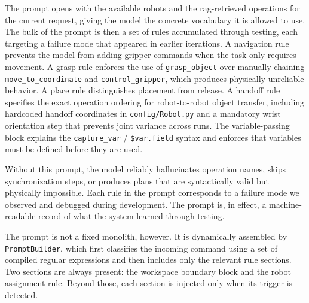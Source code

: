 \documentclass[
     12pt,
     a4paper,
     BCOR=10mm,
     DIV=14,
     listof=totoc,
     bibliography=totoc,
     parskip,
     twoside,
     headsepline
     ]{scrreprt}
\begin{document}
The prompt opens with the available robots and the \gls{rag}-retrieved operations for the current request, giving the model the concrete vocabulary it is allowed to use. The bulk of the prompt is then a set of rules accumulated through testing, each targeting a failure mode that appeared in earlier iterations. A navigation rule prevents the model from adding gripper commands when the task only requires movement. A grasp rule enforces the use of \texttt{grasp\_object} over manually chaining \texttt{move\_to\_coordinate} and \texttt{control\_gripper}, which produces physically unreliable behavior. A place rule distinguishes placement from release. A handoff rule specifies the exact operation ordering for robot-to-robot object transfer, including hardcoded handoff coordinates in \texttt{config/Robot.py} and a mandatory wrist orientation step that prevents joint variance across runs. The variable-passing block explains the \texttt{capture\_var} / \texttt{\$var.field} syntax and enforces that variables must be defined before they are used.

Without this prompt, the model reliably hallucinates operation names, skips synchronization steps, or produces plans that are syntactically valid but physically impossible. Each rule in the prompt corresponds to a failure mode we observed and debugged during development. The prompt is, in effect, a machine-readable record of what the system learned through testing.

The prompt is not a fixed monolith, however. It is dynamically assembled by \texttt{PromptBuilder}, which first classifies the incoming command using a set of compiled regular expressions and then includes only the relevant rule sections. Two sections are always present: the workspace boundary block and the robot assignment rule. Beyond those, each section is injected only when its trigger is detected.
\end{document}
